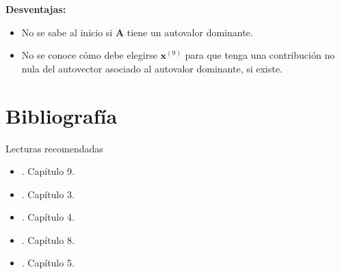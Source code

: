 \documentclass[9pt, aspectratio=169]{beamer}
\begin{document}
\begin{frame}
\textbf{Desventajas:}
\begin{itemize}
    \item No se sabe al inicio si $\bm{A}$ tiene un autovalor dominante.
    \item No se conoce cómo debe elegirse $\bm{x}^{(9)}$ para que tenga una contribución no nula del autovector asociado al autovalor dominante, si existe.
\end{itemize}
\end{frame}


\section*{Bibliografía}
\begin{frame}[allowframebreaks]{Lecturas recomendadas}
\begin{itemize}
    \item {}. Capítulo 9.
    \item {}. Capítulo 3.
    \item {}. Capítulo 4.
    \item {}. Capítulo 8.
    \item {}. Capítulo 5.
\end{itemize}
\end{frame}
\end{document}
